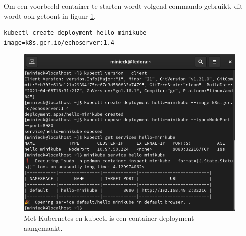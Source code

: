 Om een voorbeeld container te starten wordt volgend commando gebruikt, dit wordt ook getoont in figuur \ref{fig:hellokube}.
\begin{verbatim}
kubectl create deployment hello-minikube --image=k8s.gcr.io/echoserver:1.4
\end{verbatim}
\begin{figure}[h]
    \includegraphics[width=\linewidth]{img/hellokube.png}
    \caption[Het opstarten van een container  met kubectl]{Met Kubernetes en kubectl is een container deployment aangemaakt.}
    \label{fig:hellokube}
    \centering
\end{figure}

